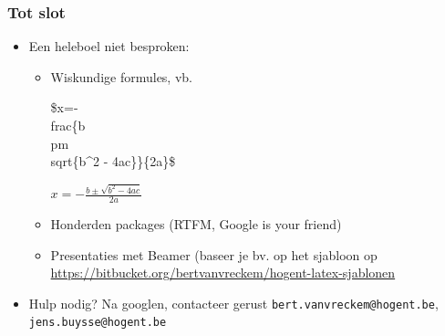 \documentclass{beamer}
\begin{document}
\begin{frame}
  \frametitle{Tot slot}
  
  \begin{itemize}
  \item Een heleboel niet besproken:
    \begin{itemize}
    \item<+-> Wiskundige formules, vb.
    \begin{semiverbatim}
    \$x=-\\frac\{b \\pm \\sqrt\{b\^{}2 - 4ac\}\}\{2a\}\$
    \end{semiverbatim}
    $x=-\frac{b \pm \sqrt{b^2 - 4ac}}{2a}$
    \item<+-> Honderden packages (RTFM, Google is your friend)
    \item<+-> Presentaties met Beamer (baseer je bv. op het sjabloon op \url{https://bitbucket.org/bertvanvreckem/hogent-latex-sjablonen}

    \end{itemize}
  \item<+-> Hulp nodig? Na googlen, contacteer gerust \texttt{bert.vanvreckem@hogent.be}, \texttt{jens.buysse@hogent.be}
  \end{itemize}
\end{frame}
\end{document}
